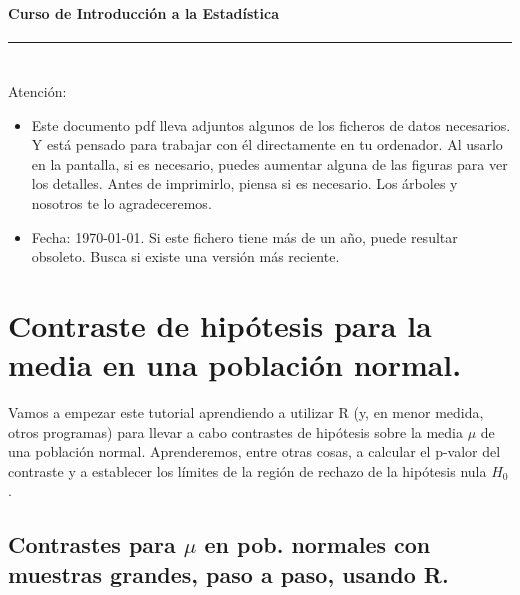 \documentclass[10pt,a4paper]{article}\usepackage[]{graphicx}\usepackage[]{color}
\newcounter {cont01}
\begin{document}


\paragraph{\hspace{6.3cm}Curso de Introducción a la Estadística\\[2mm]} \noindent\hrule

\setcounter{section}{0}
\section*{\hspace{-0.1cm}} Atención:
\begin{itemize}
  \item Este documento pdf lleva adjuntos algunos de los ficheros de datos necesarios. Y está
      pensado para trabajar con él directamente en tu ordenador. Al usarlo en la pantalla, si es
      necesario, puedes aumentar alguna de las figuras para ver los detalles. Antes de
      imprimirlo, piensa si es necesario. Los árboles y nosotros te lo agradeceremos.
  \item Fecha: \today. Si este fichero tiene más de un año, puede resultar obsoleto. Busca si
      existe una versión más reciente.
\end{itemize}
\setcounter{tocdepth}{1}
\tableofcontents

\section{Contraste de hipótesis para la media en una población normal.}
\label{tut07:sec:ContrasteHipotesis}

Vamos a empezar este tutorial aprendiendo a utilizar R (y, en menor medida, otros programas) para
llevar a cabo contrastes de hipótesis sobre la media $\mu$ de una población normal. Aprenderemos, entre otras cosas, a calcular el p-valor del contraste y a establecer los límites de la región de rechazo de la hipótesis nula $H_0$.

\subsection{Contrastes para $\mu$ en pob. normales con muestras grandes, paso a paso, usando R.}
\end{document}
